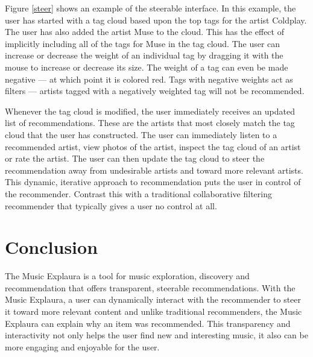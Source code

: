 \documentclass{article}
\begin{document}
Figure \ref{steer} shows an example of the steerable
interface.  In this example, the user has started with a tag cloud based
upon the top tags for the artist Coldplay.  The user has also
added the artist Muse to the cloud. This has the effect
of implicitly including all of the tags for Muse in the tag cloud.  The user can
increase or decrease the weight of an individual tag by
dragging it with the mouse to increase or decrease its size.  The weight of a
tag can even be made negative --- at which point it is colored red.
Tags with negative weights act as filters ---
artists tagged with a negatively weighted tag will not be recommended.  

Whenever the tag cloud is modified, the user
immediately receives an updated list of recommendations.  These are
the artists that most closely match the tag cloud that the user
has constructed. The user can immediately listen to a recommended artist, view
photos of the artist, inspect the tag cloud of an artist or rate the artist.
The user can then update the tag cloud to steer the recommendation 
away from undesirable artists and toward more relevant artists. This
dynamic, iterative approach to recommendation puts the user in control
of the recommender. Contrast this with a traditional collaborative
filtering recommender that typically gives a user no control at all.

\section{Conclusion}
The Music Explaura is a tool for music exploration, discovery and
recommendation that offers transparent, steerable recommendations. With
the Music Explaura, a user can dynamically interact with the
recommender to steer it toward more relevant content and unlike
traditional recommenders, the Music Explaura 
can explain why an item was recommended.
This transparency and interactivity not only helps the user find 
new and interesting music, it also can be more engaging and enjoyable 
for the user.
\end{document}
